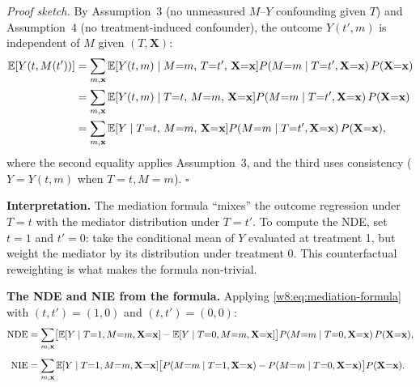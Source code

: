 \documentclass[master.tex]{subfiles}
\begin{document}
\noindent\textit{Proof sketch.}  By Assumption~3 (no unmeasured $M$--$Y$
confounding given $T$) and Assumption~4 (no treatment-induced
confounder), the outcome $Y(t', m)$ is independent of $M$ given
$(T, \mathbf{X})$:
\begin{align*}
  \mathbb{E}[Y(t, M(t'))]
  &= \sum_{m,\mathbf{x}}
     \mathbb{E}[Y(t, m) \mid M{=}m,\, T{=}t',\, \mathbf{X}{=}\mathbf{x}]
     P(M{=}m \mid T{=}t', \mathbf{X}{=}\mathbf{x})\,
     P(\mathbf{X}{=}\mathbf{x}) \\
  &= \sum_{m,\mathbf{x}}
     \mathbb{E}[Y(t, m) \mid T{=}t,\, M{=}m,\, \mathbf{X}{=}\mathbf{x}]
     P(M{=}m \mid T{=}t', \mathbf{X}{=}\mathbf{x})\,
     P(\mathbf{X}{=}\mathbf{x}) \\
  &= \sum_{m,\mathbf{x}}
     \mathbb{E}[Y \mid T{=}t,\, M{=}m,\, \mathbf{X}{=}\mathbf{x}]
     P(M{=}m \mid T{=}t', \mathbf{X}{=}\mathbf{x})\,
     P(\mathbf{X}{=}\mathbf{x}),
\end{align*}
where the second equality applies Assumption~3, and the third uses
consistency ($Y = Y(t, m)$ when $T = t, M = m$). \hfill$\square$

\medskip\noindent\textbf{Interpretation.}  The mediation formula
``mixes'' the outcome regression under $T = t$ with the mediator
distribution under $T = t'$.  To compute the NDE, set $t = 1$ and
$t' = 0$: take the conditional mean of $Y$ evaluated at treatment 1,
but weight the mediator by its distribution under treatment 0.  This
counterfactual reweighting is what makes the formula non-trivial.

\medskip\noindent\textbf{The NDE and NIE from the formula.}  Applying
\eqref{w8:eq:mediation-formula} with $(t, t') = (1, 0)$ and
$(t, t') = (0, 0)$:
\begin{align*}
  \mathrm{NDE}
  &= \sum_{m,\mathbf{x}}
     \bigl[\mathbb{E}[Y \mid T{=}1, M{=}m, \mathbf{X}{=}\mathbf{x}]
          - \mathbb{E}[Y \mid T{=}0, M{=}m, \mathbf{X}{=}\mathbf{x}]\bigr]
     P(M{=}m \mid T{=}0, \mathbf{X}{=}\mathbf{x})\,
     P(\mathbf{X}{=}\mathbf{x}), \\[4pt]
  \mathrm{NIE}
  &= \sum_{m,\mathbf{x}}
     \mathbb{E}[Y \mid T{=}1, M{=}m, \mathbf{X}{=}\mathbf{x}]
     \bigl[P(M{=}m \mid T{=}1, \mathbf{X}{=}\mathbf{x})
          - P(M{=}m \mid T{=}0, \mathbf{X}{=}\mathbf{x})\bigr]
     P(\mathbf{X}{=}\mathbf{x}).
\end{align*}
\end{document}
